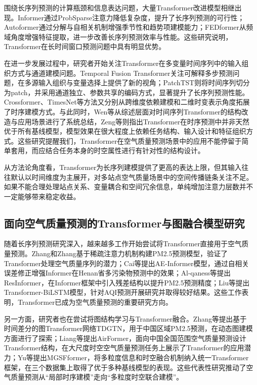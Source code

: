 围绕长序列预测的计算瓶颈和信息表达问题，大量Transformer改进模型相继出现。Informer通过ProbSparse注意力降低复杂度，提升了长序列预测的可行性\cite{zhou_informer_2021}；Autoformer通过分解与自相关机制增强季节性和趋势项建模能力\cite{wu_autoformer_2021}；FEDformer从频域角度增强特征提取，进一步改善长序列预测效率与性能\cite{zhou_fedformer_2022}。这些研究说明，Transformer在长时间窗口预测问题中具有明显优势。

在进一步发展过程中，研究者开始关注Transformer在多变量时间序列中的输入组织方式与通道建模问题。Temporal Fusion Transformer关注可解释多步预测问题，在多源输入组织与变量选择上提供了新的视角\cite{lim_temporal_2021}；PatchTST则将时间序列切分为patch，并采用通道独立、参数共享的编码方式，显著提升了长序列预测性能\cite{nie_time_2023}。Crossformer、TimesNet等方法又分别从跨维度依赖建模和二维时变表示角度拓展了时序建模方式\cite{zhang_crossformer_2022,wu_timesnet_2022}。与此同时，Wen等从综述层面对时间序列Transformer的结构改造与应用场景进行了系统总结\cite{wen_transformers_2023}，Zeng等则指出Transformer在时序预测中并非天然优于所有基线模型，模型效果在很大程度上依赖任务结构、输入设计和特征组织方式\cite{zeng_are_2023}。这些研究提醒我们，Transformer在空气质量预测场景中的应用不能停留于简单套用，而应结合任务本身的时空属性进行有针对性的结构设计。

从方法论角度看，Transformer为长序列建模提供了更高的表达上限，但其输入往往默认以时间维度为主展开，对多站点空气质量场景中的空间传播链条关注不足。如果不能合理处理站点关系、变量耦合和空间冗余信息，单纯增加注意力层数并不一定能够带来稳定收益。

\subsection{面向空气质量预测的Transformer与图融合模型研究}

随着长序列预测研究深入，越来越多工作开始尝试将Transformer直接用于空气质量预测。Zhang和Zhang基于稀疏注意力机制构建PM2.5预测模型，验证了Transformer处理空气质量序列的潜力\cite{zhang_modeling_2023}；Cai等提出AE-Informer模型，通过自相关误差修正增强Informer在Henan省多污染物预测中的效果\cite{cai_improving_2023}；Al-qaness等提出ResInformer，在Informer框架中引入残差结构以提升PM2.5预测精度\cite{al-qaness_resinformer_2023}；Liu等提出Transformer-BiLSTM模型，针对AQI预测开展研究并取得较好结果\cite{liu_intelligent_2025}。这些工作表明，Transformer已成为空气质量预测的重要研究方向。

另一方面，研究者也在尝试将图结构学习与Transformer融合。Zhang等提出基于时间差分的图Transformer网络TDGTN，用于中国区域PM2.5预测，在动态图建模方面进行了探索\cite{zhang_temporal_2022}；Liang等提出AirFormer，面向中国全国范围空气质量预测设计Transformer结构，在大尺度时空空气质量预测任务上展示了Transformer的应用潜力\cite{liang_airformer_2023}；Yu等提出MGSFformer，将多粒度信息和时空融合机制纳入统一Transformer框架，在三个数据集上取得了优于多种基线模型的表现\cite{yu_mgsfformer_2025}。这些代表性研究推动了空气质量预测从“局部时序建模”走向“多粒度时空联合建模”。

